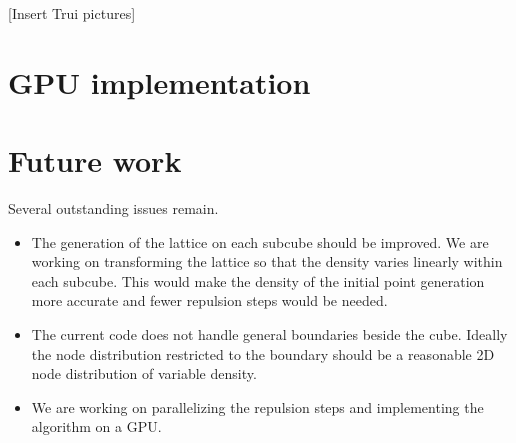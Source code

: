 \documentclass[10pt]{amsart}
\begin{document}
[Insert Trui pictures]


\section{GPU implementation}


\section{Future work}

Several outstanding issues remain. 
\begin{itemize}
\item The generation of the lattice on each subcube should be improved. We are working on transforming the lattice so that the density varies linearly within each subcube. This would make the density of the initial point generation more accurate and fewer repulsion steps would be needed.
\item The current code does not handle general boundaries beside the cube. Ideally the node distribution restricted to the boundary should be a reasonable 2D node distribution of variable density.
\item We are working on parallelizing the repulsion steps and implementing the algorithm on a GPU. \cite{Recipes1989}
\end{itemize}



\end{document}
